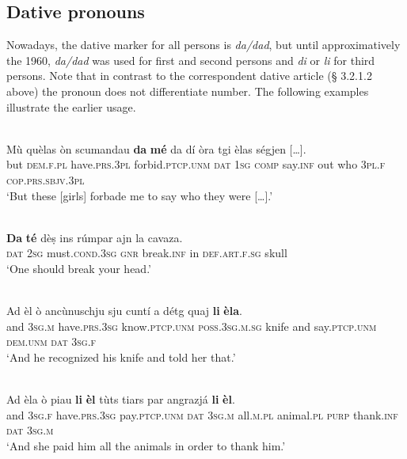 \subsection{Dative pronouns}
Nowadays, the dative marker for all persons is \textit{da/dad}, but until approximatively the 1960, \textit{da/dad} was used for first and second persons and \textit{di} or \textit{li} for third persons. Note that in contrast to the correspondent dative article (§ 3.2.1.2 above) the pronoun does not differentiate number. The following examples illustrate the earlier usage. 

\ea\label{}
\\
\gll    Mù quèlas òn scumandau \textbf{da} \textbf{mé} da dí òra tgi èlas ségjen […].\\
     but \textsc{dem.f.pl} have.\textsc{prs.3pl} forbid.\textsc{ptcp.unm} \textsc{dat} \textsc{1sg} \textsc{comp} say.\textsc{inf} out who \textsc{3pl.f} \textsc{cop.prs.sbjv.3pl} \\
\glt `But these [girls] forbade me to say who they were […].'
\z

\ea\label{}
\\
\gll   \textbf{Da} \textbf{té} dèṣ ins rúmpar ajn la cavaza.\\
\textsc{dat} \textsc{2sg} must.\textsc{cond.3sg} \textsc{gnr} break.\textsc{inf} in \textsc{def.art.f.sg} skull\\
\glt `One should break your head.'
\z

\ea\label{}
\\
\gll  Ad èl ò ancùnuschju sju cuntí a détg quaj \textbf{li} \textbf{èla}. \\
 and 3\textsc{sg.m} have.\textsc{prs.3sg} know.\textsc{ptcp.unm}  \textsc{poss.3sg.m.sg} knife and say.\textsc{ptcp.unm} \textsc{dem.unm} \textsc{dat} \textsc{3sg.f}\\
\glt `And he recognized his knife and told her that.'
\z
 
\ea\label{}
\\
\gll  Ad èla ò piau \textbf{li} \textbf{èl} tùts tiars par angrazjá \textbf{li} \textbf{èl}.\\
     and 3\textsc{sg}.\textsc{f} have.\textsc{prs}.3\textsc{sg} pay.\textsc{ptcp.unm} \textsc{dat} 3\textsc{sg}.\textsc{m} all.\textsc{m}.\textsc{pl} animal.\textsc{pl} \textsc{purp} thank.\textsc{inf} \textsc{dat} 3\textsc{sg}.\textsc{m}\\
\glt `And she paid him all the animals in order to thank him.'
\z


